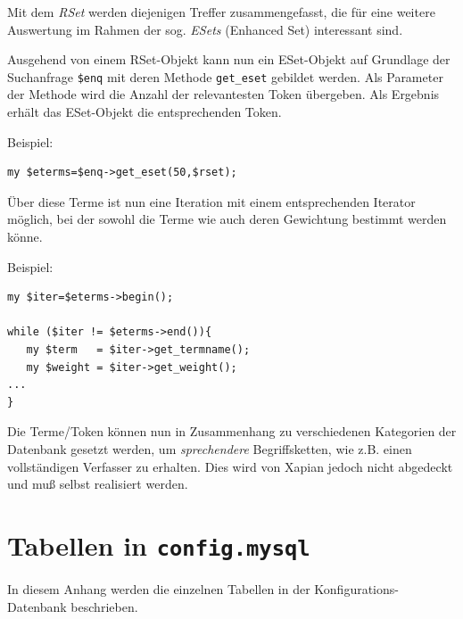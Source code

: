 \documentclass[11pt, twoside, a4paper, BCOR8mm, DIV12, bibtotoc,idxtotoc]{scrbook}
\begin{document}
Mit dem \emph{RSet} werden diejenigen Treffer zusammengefasst, die für
eine weitere Auswertung im Rahmen der sog. \emph{ESets} (Enhanced Set)
interessant sind.

Ausgehend von einem RSet-Objekt kann nun ein ESet-Objekt auf Grundlage
der Suchanfrage \texttt{\$enq} mit deren Methode \texttt{get\_eset}
gebildet werden. Als Parameter der Methode wird die Anzahl der
relevantesten Token übergeben. Als Ergebnis erhält das ESet-Objekt die
entsprechenden Token.

Beispiel:
\begin{verbatim}
my $eterms=$enq->get_eset(50,$rset);
\end{verbatim}

Über diese Terme ist nun eine Iteration mit einem entsprechenden
Iterator möglich, bei der sowohl die Terme wie auch deren Gewichtung
bestimmt werden könne.

Beispiel:
\begin{verbatim}
my $iter=$eterms->begin();
                    
while ($iter != $eterms->end()){
   my $term   = $iter->get_termname();
   my $weight = $iter->get_weight();
...
}
\end{verbatim}


Die Terme/Token können nun in Zusammenhang zu verschiedenen Kategorien der
Datenbank gesetzt werden, um \emph{sprechendere} Begriffsketten, wie
z.B. einen vollständigen Verfasser zu erhalten. Dies wird von Xapian
jedoch nicht abgedeckt und muß selbst realisiert werden.

\chapter{Tabellen in \texttt{config.mysql}}

In diesem Anhang werden die einzelnen Tabellen in der
Konfigurations-Datenbank beschrieben.
\end{document}
